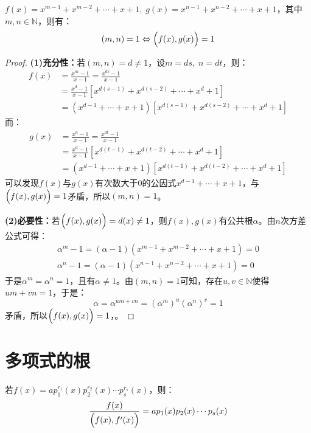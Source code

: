 \begin{theorem}
	$f(x)=x^{m-1}+x^{m-2}+\cdots+x+1,\;g(x)=x^{n-1}+x^{n-2}+\cdots+x+1$，其中$m,n\in\mathbb{N}$，则有：
	\begin{equation*}
		(m,n)=1\Leftrightarrow\Bigl(f(x),g(x)\Bigr)=1
	\end{equation*}
\end{theorem}
\begin{proof}
	\textbf{(1)充分性：}若$(m,n)=d\ne1$，设$m=ds,\;n=dt$，则：
	\begin{align*}
		f(x)
		&=\frac{x^m-1}{x-1}=\frac{x^{ds}-1}{x-1} \\
		&=\frac{x^d-1}{x-1}[x^{d(s-1)}+x^{d(s-2)}+\cdots+x^d+1] \\
		&=(x^{d-1}+\cdots+x+1)[x^{d(s-1)}+x^{d(s-2)}+\cdots+x^d+1]
	\end{align*}
	而：
	\begin{align*}
		g(x)
		&=\frac{x^n-1}{x-1}=\frac{x^{dt}-1}{x-1} \\
		&=\frac{x^d-1}{x-1}[x^{d(t-1)}+x^{d(t-2)}+\cdots+x^d+1] \\
		&=(x^{d-1}+\cdots+x+1)[x^{d(t-1)}+x^{d(t-2)}+\cdots+x^d+1]
	\end{align*}
	可以发现$f(x)$与$g(x)$有次数大于$0$的公因式$x^{d-1}+\cdots+x+1$，与$\Bigl(f(x),g(x)\Bigr)=1$矛盾，所以$(m,n)=1$。\par
	\textbf{(2)必要性：}若$\Bigl(f(x),g(x)\Bigr)=d(x)\ne1$，则$f(x),g(x)$有公共根$\alpha$。由$n$次方差公式可得：
	\begin{gather*}
		\alpha^m-1=(\alpha-1)(x^{m-1}+x^{m-2}+\cdots+x+1)=0 \\
		\alpha^n-1=(\alpha-1)(x^{n-1}+x^{n-2}+\cdots+x+1)=0
	\end{gather*}
	于是$\alpha^m=\alpha^n=1$，且有$\alpha\ne1$。由$(m,n)=1$可知，存在$u,v\in\mathbb{N}$使得$um+vn=1$，于是：
	\begin{equation*}
		\alpha=\alpha^{um+vn}=(\alpha^m)^u(\alpha^n)^v=1
	\end{equation*}
	矛盾，所以$\Bigl(f(x),g(x)\Bigr)=1$，。
\end{proof}

\section{多项式的根}
\begin{theorem}\label{theo:SameIrreducible polynomial}
	若$f(x)=ap_1^{r_1}(x)p_2^{r_2}(x)\cdots p_s^{r_s}(x)$，则：
	\begin{equation*}
		\frac{f(x)}{\Bigl(f(x),f'(x)\Bigr)}=ap_1(x)p_2(x)\cdots p_s(x)
	\end{equation*}
\end{theorem}

